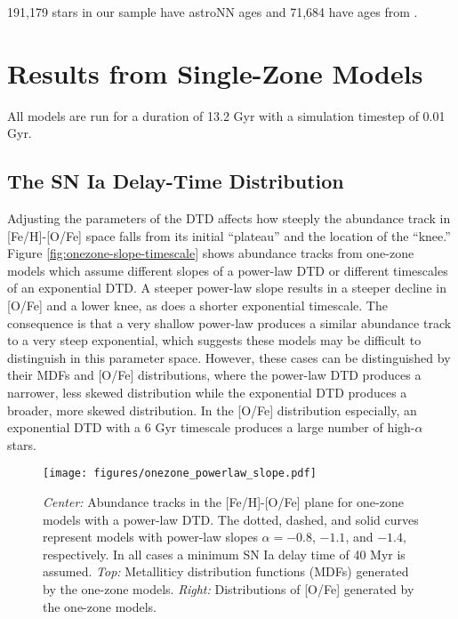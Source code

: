 \documentclass[twocolumn,linenumbers,twocolappendix]{aastex631}
\begin{document}
191,179 stars in our sample have astroNN ages and 71,684 have ages from \citet{Leung2023-Ages}.


\section{Results from Single-Zone Models}
\label{sec:onezone-results}

All models are run for a duration of 13.2 Gyr with a simulation timestep of 0.01 Gyr.

\subsection{The SN Ia Delay-Time Distribution}

Adjusting the parameters of the DTD affects how steeply the abundance track in [Fe/H]-[O/Fe] space falls from its initial ``plateau'' and the location of the ``knee.'' Figure \ref{fig:onezone-slope-timescale} shows abundance tracks from one-zone models which assume different slopes of a power-law DTD or different timescales of an exponential DTD. A steeper power-law slope results in a steeper decline in [O/Fe] and a lower knee, as does a shorter exponential timescale. The consequence is that a very shallow power-law produces a similar abundance track to a very steep exponential, which suggests these models may be difficult to distinguish in this parameter space. However, these cases can be distinguished by their MDFs and [O/Fe] distributions, where the power-law DTD produces a narrower, less skewed distribution while the exponential DTD produces a broader, more skewed distribution. In the [O/Fe] distribution especially, an exponential DTD with a 6 Gyr timescale produces a large number of high-$\alpha$ stars.

\begin{figure}
    \centering
    \texttt{[image: figures/onezone\_powerlaw\_slope.pdf]}
    \caption{\textit{Center:} Abundance tracks in the [Fe/H]-[O/Fe] plane for one-zone models with a power-law DTD. The dotted, dashed, and solid curves represent models with power-law slopes $\alpha=-0.8$, $-1.1$, and $-1.4$, respectively. In all cases a minimum SN Ia delay time of 40 Myr is assumed. \textit{Top:} Metalliticy distribution functions (MDFs) generated by the one-zone models. \textit{Right:} Distributions of [O/Fe] generated by the one-zone models.}
    \label{fig:onezone-powerlaw-slope}
\end{figure}
\end{document}

